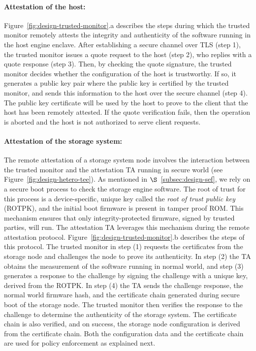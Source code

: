 \paragraph{Attestation of the host:} Figure~\ref{fig:design-trusted-monitor}.a describes the steps during which the trusted monitor remotely attests the integrity and authenticity of the software running in the host engine enclave. After establishing a secure channel over TLS (step 1), the trusted monitor issues a quote request to the host (step 2), who replies with a quote response (step 3). Then, by checking the quote signature, the trusted monitor decides whether the configuration of the host is trustworthy. If so, it generates a public key pair where the public key is certified by the trusted monitor, and sends this information to the host over the secure channel (step 4). The public key certificate will be used by the host to prove to the client that the host has been remotely attested. If the quote verification fails, then the operation is aborted and the host is not authorized to serve \project client requests.

\paragraph{Attestation of the storage system:} The remote attestation of a storage system node involves the interaction between the trusted monitor and the attestation TA running in secure world (see Figure~\ref{fig:design-hetero-tee}). As mentioned in $\S$~\ref{subsec:design-sef}, we rely on a secure boot process to check the storage engine software.
The root of trust for this process is a device-specific, unique key called the \textit{root of trust public key} (ROTPK), and the initial boot firmware is present in tamper proof ROM. This mechanism ensures that only integrity-protected firmware, signed by trusted parties, will run. The attestation TA leverages this mechanism during the remote attestation protocol. Figure~\ref{fig:design-trusted-monitor}.b describes the steps of this protocol.
The trusted monitor in step (1) requests the certificates from the storage node and challenges the node to prove its authenticity. In step (2) the TA obtains the measurement of the software running in normal world, and step (3) generates a response to the challenge by signing the challenge with a unique key, derived from the ROTPK. %
In step (4) the TA sends the challenge response, the normal world firmware hash, and the certificate chain generated during secure boot of the storage node. The trusted monitor then verifies the response to the challenge to determine the authenticity of the storage system. The certificate chain is also verified, and on success, the storage node configuration is derived from the certificate chain. Both the configuration data and the certificate chain are used for policy enforcement as explained next. 

